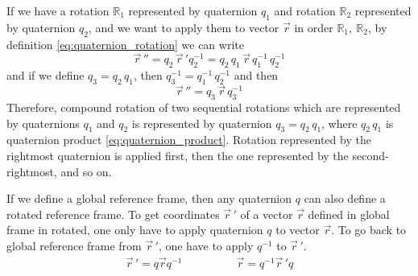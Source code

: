 If we have a rotation $\mathbb{R}_1$ represented by quaternion $q_1$ and rotation $\mathbb{R}_2$ represented by quaternion $q_2$, and we want to apply them to vector $\vec{r}$ in order $\mathbb{R}_1,\ \mathbb{R}_2$, by definition \eqref{eq:quaternion_rotation} we can write
\begin{equation}
	\vec{r}\,''
	= q_2\, \vec{r}\,' q_2^{-1} 
	= q_2\, q_1\, \vec{r}\, q_1^{-1}\, q_2^{-1}
\end{equation}
and if we define $q_3 = q_2\, q_1$, then $q_3^{-1} = q_1^{-1}\, q_2^{-1}$ and then
\begin{equation}
	\vec{r}\,'' = q_3\, \vec{r}\, q_3^{-1}
\end{equation}
Therefore, compound rotation of two sequential rotations which are represented by quaternions $q_1$ and $q_2$ is represented by quaternion $q_3 = q_2\, q_1$, where $q_2\, q_1$ is quaternion product \eqref{eq:quaternion_product}. Rotation represented by the rightmost quaternion is applied first, then the one represented by the second-rightmost, and so on.

If we define a global reference frame, then any quaternion $q$ can also define a rotated reference frame. To get coordinates $\vec{r}\,'$ of a vector $\vec{r}$ defined in global frame in rotated, one only have to apply quaternion $q$ to vector $\vec{r}$. To go back to global reference frame from $\vec{r}\,'$, one have to apply $q^{-1}$ to $\vec{r}\,'$.
\begin{equation}
	\begin{aligned}
		\vec{r}\,' = q \vec{r} q^{-1}
	\end{aligned}
	\qquad
	\qquad
	\begin{aligned}
		\vec{r} = q^{-1} \vec{r}\,' q
	\end{aligned}
\end{equation}
